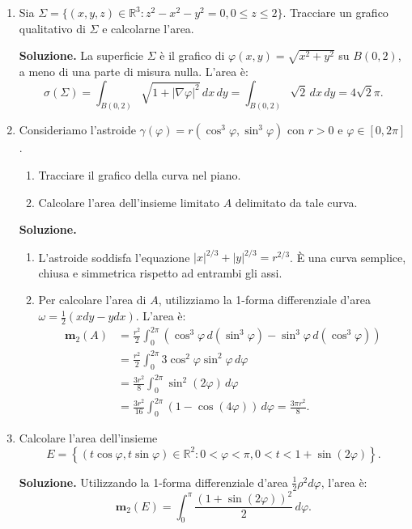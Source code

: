 \begin{enumerate}
	
	\item Sia $\Sigma = \{(x,y,z) \in \mathbb{R}^3 : z^2 - x^2 - y^2 = 0, 0 \leq z \leq 2\}$. Tracciare un grafico qualitativo di $\Sigma$ e calcolarne l'area.
	
	\textbf{Soluzione.}
		La superficie $\Sigma$ è il grafico di $\varphi(x,y) = \sqrt{x^2 + y^2}$ su $B(0,2)$, a meno di una parte di misura nulla. L'area è:
		\[
		\sigma(\Sigma) = \int_{B(0,2)} \sqrt{1 + |\nabla \varphi|^2} \, dx \, dy = \int_{B(0,2)} \sqrt{2} \, dx \, dy = 4\sqrt{2}\pi.
		\]

	
	\item Consideriamo l'astroide $\gamma(\varphi) = r(\cos^3 \varphi, \sin^3 \varphi)$ con $r > 0$ e $\varphi \in [0, 2\pi]$.
	\begin{enumerate}
		\item Tracciare il grafico della curva nel piano.
		\item Calcolare l'area dell'insieme limitato $A$ delimitato da tale curva.
	\end{enumerate}
	
	\textbf{Soluzione.}
		\begin{enumerate}
			\item L'astroide soddisfa l'equazione $|x|^{2/3} + |y|^{2/3} = r^{2/3}$. È una curva semplice, chiusa e simmetrica rispetto ad entrambi gli assi.
			
			\item Per calcolare l'area di $A$, utilizziamo la 1-forma differenziale d'area $\omega = \frac{1}{2}(x dy - y dx)$. L'area è:
			\[
			\begin{aligned}
				\mathbf{m}_2(A) &= \frac{r^2}{2} \int_0^{2\pi} \left(\cos^3 \varphi \, d(\sin^3 \varphi) - \sin^3 \varphi \, d(\cos^3 \varphi)\right) \\
				&= \frac{r^2}{2} \int_0^{2\pi} 3 \cos^2 \varphi \sin^2 \varphi \, d\varphi \\
				&= \frac{3r^2}{8} \int_0^{2\pi} \sin^2(2\varphi) \, d\varphi \\
				&= \frac{3r^2}{16} \int_0^{2\pi} (1 - \cos(4\varphi)) \, d\varphi = \frac{3\pi r^2}{8}.
			\end{aligned}
			\]
		\end{enumerate}
	
	
	\item Calcolare l'area dell'insieme
	\[
	E = \left\{(t \cos \varphi, t \sin \varphi) \in \mathbb{R}^2 : 0 < \varphi < \pi, 0 < t < 1 + \sin(2\varphi)\right\}.
	\]
	
	\textbf{Soluzione.}
		Utilizzando la 1-forma differenziale d'area $\frac{1}{2} \rho^2 d\varphi$, l'area è:
		\[
		\mathbf{m}_2(E) = \int_0^\pi \frac{(1 + \sin(2\varphi))^2}{2} \, d\varphi.
		\]


\end{enumerate}
